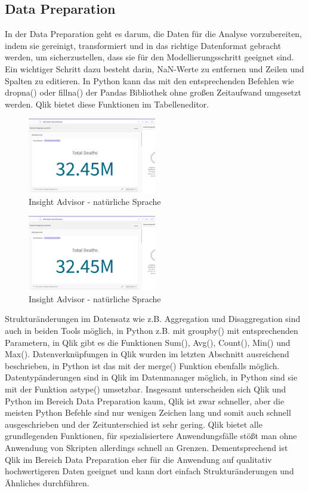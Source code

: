 \documentclass[12pt]{article}
\begin{document}
	\subsection{Data Preparation}
	In der Data Preparation geht es darum, die Daten für die Analyse vorzubereiten, indem sie gereinigt, transformiert und in das richtige Datenformat gebracht werden, um sicherzustellen, dass sie für den Modellierungsschritt geeignet sind.
	Ein wichtiger Schritt dazu besteht darin, NaN-Werte zu entfernen und Zeilen und Spalten zu editieren. In Python kann das mit den entsprechenden Befehlen wie dropna() oder fillna() der Pandas Bibliothek ohne großen Zeitaufwand umgesetzt werden.
	Qlik bietet diese Funktionen im Tabelleneditor.
	
	\begin{figure}[h]
		\centering
		\includegraphics[width=0.5\textwidth]{bsp_ask}
		\caption{Insight Advisor - natürliche Sprache}
	\end{figure}
	\begin{figure}[h]
		\centering
		\includegraphics[width=0.5\textwidth]{bsp_ask}
		\caption{Insight Advisor - natürliche Sprache}
	\end{figure}
	
	
	Strukturänderungen im Datensatz wie z.B. Aggregation und Disaggregation sind auch in beiden Tools möglich, in Python z.B. mit groupby() mit entsprechenden Parametern, in Qlik gibt es die Funktionen Sum(), Avg(), Count(), Min() und Max().
	Datenverknüpfungen in Qlik wurden im letzten Abschnitt  ausreichend beschrieben, in Python ist das mit der  merge() Funktion ebenfalls möglich.
	Datentypänderungen sind in Qlik im Datenmanager möglich, in Python sind sie mit der Funktion astype() umsetzbar.
	Insgesamt unterscheiden sich Qlik und Python im Bereich Data Preparation kaum, Qlik ist zwar schneller, aber die meisten Python Befehle sind nur wenigen Zeichen lang und somit auch schnell ausgeschrieben und der Zeitunterschied ist sehr gering. Qlik bietet alle grundlegenden Funktionen, für spezialisiertere Anwendungsfälle stößt man ohne Anwendung von Skripten allerdings schnell an Grenzen. Dementsprechend ist Qlik im Bereich Data Preparation eher für die Anwendung auf qualitativ hochwertigeren Daten geeignet und kann dort einfach Strukturänderungen und Ähnliches durchführen.
	
\end{document}
